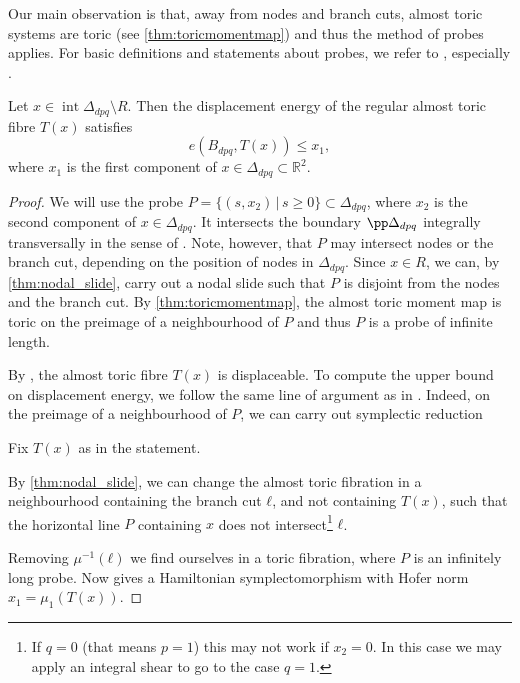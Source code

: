 \documentclass[12pt,a4paper,draft]{scrartcl}
\begin{document}
Our main observation is that, away from nodes and branch cuts, almost toric systems are toric (see \cref{thm:toricmomentmap}) and thus the method of probes applies. For basic definitions and statements about probes, we refer to \cite{mcduff2011displacing}, especially \cite[Definition 2.3, Lemma 2.4]{mcduff2011displacing}.


\begin{lemma}
    \label{thm:upper_bound}
    Let $x \in \operatorname{int} \Delta_{dpq} \setminus R$. Then the displacement energy of the regular almost toric fibre $T(x)$ satisfies
    \[ e(B_{dpq},T(x))\leq x_1, \]
    where $x_1$ is the first component of $x \in \Delta_{dpq} \subset \mathbb{R}^2$.
\end{lemma}


\begin{proof}
We will use the probe $P = \{(s,x_2) \, \vert \, s \geqslant 0\} \subset \Delta_{dpq}$, where $x_2$ is the second component of $x \in \Delta_{dpq}$. It intersects the boundary $\pp \Delta_{dpq}$ integrally transversally in the sense of \cite[Section 2.1]{mcduff2011displacing}. Note, however, that $P$ may intersect nodes or the branch cut, depending on the position of nodes in $\Delta_{dpq}$. Since $x \in R$, we can, by \cref{thm:nodal_slide}, carry out a nodal slide such that $P$ is disjoint from the nodes and the branch cut. By \cref{thm:toricmomentmap}, the almost toric moment map is toric on the preimage of a neighbourhood of $P$ and thus $P$ is a probe of infinite length. 

By \cite[Lemma 2.4]{mcduff2011displacing}, the almost toric fibre $T(x)$ is displaceable. To compute the upper bound on displacement energy, we follow the same line of argument as in \cite[Proposition 3.4]{brendel2020real}. Indeed, on the preimage of a neighbourhood of $P$, we can carry out symplectic reduction 




  Fix $T(x)$ as in the statement.
  
By \cref{thm:nodal_slide}, we can change the almost toric fibration in a neighbourhood containing the branch cut $ℓ$, and not containing $T(x)$, such that the horizontal line $P$ containing $x$ does not intersect\footnote{If $q=0$ (that means $p=1$) this may not work if $x_2=0$. In this case we may apply an integral shear to go to the case $q=1$.} $ℓ$.

Removing $μ^{-1}(ℓ)$ we find ourselves in a toric fibration, where $P$ is an infinitely long probe. Now \cite[Lemma 2.4]{mcduff2011displacing} gives a Hamiltonian symplectomorphism with Hofer norm $x_1 = μ_1(T(x))$.
\end{proof}
\end{document}
